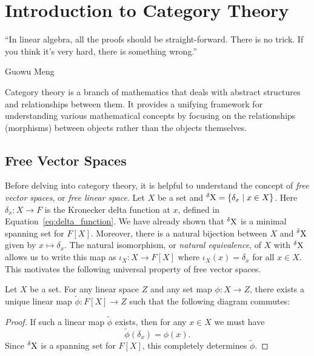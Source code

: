 \chapter{Introduction to Category Theory}

\epigraph{``In linear algebra, all the proofs should be straight-forward. There is no trick. If you think it's very hard, there is something wrong.''}{Guowu Meng}

Category theory is a branch of mathematics that deals with abstract structures and relationships between them. It provides a unifying framework for understanding various mathematical concepts by focusing on the relationships (morphisms) between objects rather than the objects themselves.

\section{Free Vector Spaces}

Before delving into category theory, it is helpful to understand the concept of \emph{free vector spaces}, or \emph{free linear space}. Let $X$ be a set and $\operatorname{{}^{\delta} X} = \{ \delta_x \mid x \in X \}$. Here $\delta_x \colon X \to F$ is the Kronecker delta function at $x$, defined in Equation~\eqref{eq:delta_function}. We have already shown that $\operatorname{{}^{\delta} X}$ is a minimal spanning set for $F[X]$. Moreover, there is a natural bijection between $X$ and $\operatorname{{}^{\delta} X}$ given by $x \mapsto \delta_x$. The natural isomorphism, or \emph{natural equivalence}, of $X$ with $\operatorname{{}^{\delta} X}$ allows us to write this map as $\iota_X \colon X \to F[X]$ where $\iota_X(x) = \delta_x$ for all $x \in X$. This motivates the following universal property of free vector spaces.

\begin{proposition}\label{prop:universal_property_free_vector_space}
  Let $X$ be a set. For any linear space $Z$ and any set map $\phi \colon X \to Z$, there exists a unique linear map $\widetilde{\phi} \colon F[X] \to Z$ such that the following diagram commutes:
  \begin{center}
  \end{center}
\end{proposition}
\begin{proof}
  If such a linear map $\widetilde{\phi}$ exists, then for any $x \in X$ we must have
  \[
    \widetilde{\phi}(\delta_x) = \phi(x).
  \]
  Since $\operatorname{{}^{\delta} X}$ is a spanning set for $F[X]$, this completely determines $\widetilde{\phi}$.
\end{proof}

